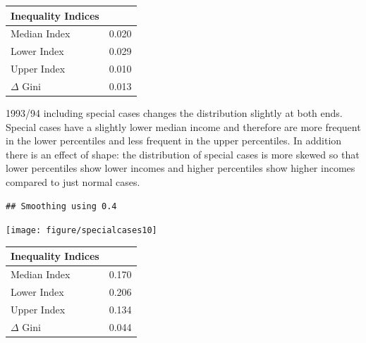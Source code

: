 \documentclass[twoside]{article}\usepackage[]{graphicx}\usepackage[]{color}
\makeatletter
\newenvironment{kframe}{%
 \def\at@end@of@kframe{}%
 \ifinner\ifhmode%
  \def\at@end@of@kframe{\end{minipage}}%
  \begin{minipage}{\columnwidth}%
 \fi\fi%
 \def\FrameCommand##1{\hskip\@totalleftmargin \hskip-\fboxsep
 \colorbox{shadecolor}{##1}\hskip-\fboxsep
     \hskip-\linewidth \hskip-\@totalleftmargin \hskip\columnwidth}%
 \MakeFramed {\advance\hsize-\width
   \@totalleftmargin\z@ \linewidth\hsize
   \@setminipage}}%
 {\par\unskip\endMakeFramed%
 \at@end@of@kframe}
\newenvironment{knitrout}{}{} %
\makeatother
\begin{document}
\begin{multicols}{2}
\begin{knitrout}
\end{knitrout}

%
\begin{table}[!tbp]
\begin{center}
\begin{tabular}{ll}
\hline\hline
\multicolumn{1}{l}{Inequality Indices}&\multicolumn{1}{c}{}\tabularnewline
\hline
Median Index&0.020\tabularnewline
Lower Index&0.029\tabularnewline
Upper Index&0.010\tabularnewline
$\Delta$ Gini&0.013\tabularnewline
\hline
\end{tabular}
\end{center}
\end{table}



1993/94 including special cases changes the distribution slightly at both ends. Special cases have a slightly lower median income and therefore are more frequent in the lower percentiles and less frequent in the upper percentiles. In addition there is an effect of shape: the distribution of special cases is more skewed so that lower percentiles show lower incomes and higher percentiles show higher incomes compared to just normal cases.



\begin{knitrout}
\color{fgcolor}\begin{kframe}
\begin{verbatim}
## Smoothing using 0.4
\end{verbatim}
\end{kframe}
\texttt{[image: figure/specialcases10]} 

\end{knitrout}

%
\begin{table}[!tbp]
\begin{center}
\begin{tabular}{ll}
\hline\hline
\multicolumn{1}{l}{Inequality Indices}&\multicolumn{1}{c}{}\tabularnewline
\hline
Median Index&0.170\tabularnewline
Lower Index&0.206\tabularnewline
Upper Index&0.134\tabularnewline
$\Delta$ Gini&0.044\tabularnewline
\hline
\end{tabular}
\end{center}
\end{table}




\end{multicols}
\end{document}
